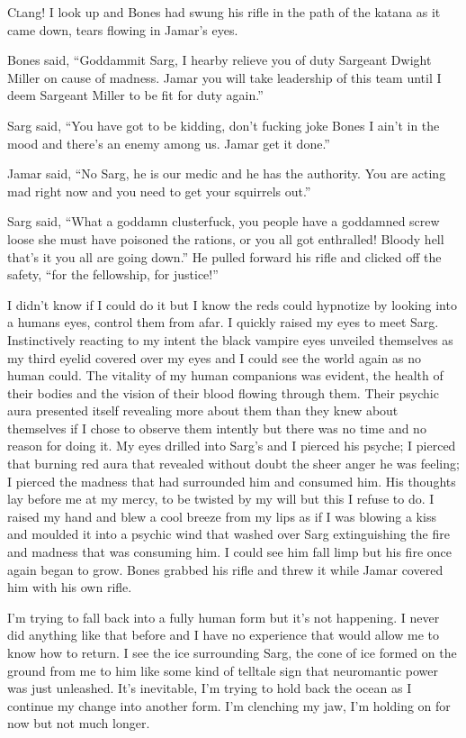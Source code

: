 \lettrine[lines=2,lraise=0]{C}lang! I look up and Bones had swung his rifle in the path of the katana as it came down, tears flowing in Jamar's eyes.

Bones said, ``Goddammit Sarg, I hearby relieve you of duty Sargeant Dwight Miller on cause of madness. Jamar you will take leadership of this team until I deem Sargeant Miller to be fit for duty again.''

Sarg said, ``You have got to be kidding, don't fucking joke Bones I ain't in the mood and there's an enemy among us. Jamar get it done.''

Jamar said, ``No Sarg, he is our medic and he has the authority. You are acting mad right now and you need to get your squirrels out.''

Sarg said, ``What a goddamn clusterfuck, you people have a goddamned screw loose she must have poisoned the rations, or you all got enthralled! Bloody hell that's it you all are going down.'' He pulled forward his rifle and clicked off the safety, ``for the fellowship, for justice!''

I didn't know if I could do it but I know the reds could hypnotize by looking into a humans eyes, control them from afar. I quickly raised my eyes to meet Sarg. Instinctively reacting to my intent the black vampire eyes unveiled themselves as my third eyelid covered over my eyes and I could see the world again as no human could. The vitality of my human companions was evident, the health of their bodies and the vision of their blood flowing through them. Their psychic aura presented itself revealing more about them than they knew about themselves if I chose to observe them intently but there was no time and no reason for doing it. My eyes drilled into Sarg's and I pierced his psyche; I pierced that burning red aura that revealed without doubt the sheer anger he was feeling; I pierced the madness that had surrounded him and consumed him. His thoughts lay before me at my mercy, to be twisted by my will but this I refuse to do. I raised my hand and blew a cool breeze from my lips as if I was blowing a kiss and moulded it into a psychic wind that washed over Sarg extinguishing the fire and madness that was consuming him. I could see him fall limp but his fire once again began to grow. Bones grabbed his rifle and threw it while Jamar covered him with his own rifle. 

I'm trying to fall back into a fully human form but it's not happening. I never did anything like that before and I have no experience that would allow me to know how to return. I see the ice surrounding Sarg, the cone of ice formed on the ground from me to him like some kind of telltale sign that neuromantic power was just unleashed. It's inevitable, I'm trying to hold back the ocean as I continue my change into another form. I'm clenching my jaw, I'm holding on for now but not much longer.

